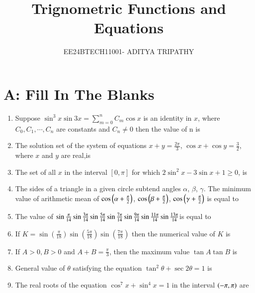 \documentclass[journal,12pt,twocolumn]{IEEEtran}
\title{Trignometric Functions and Equations}
\author{EE24BTECH11001- ADITYA TRIPATHY}
\theoremstyle{remark}
\begin{document}
\maketitle

\section*{\textbf{A: Fill In The Blanks}}


\begin{enumerate}
	


	 
	\item Suppose $\sin^3{x}\sin3x = \sum_{m=0}^{n} C_m \cos x $ is an identity in $x$, where $C_0, C_1, \cdots , C_n$ are constants and $C_n \neq 0$ then the value of n is
		\hfill{}


	\item The solution set of the system of equations \(x + y = \frac{2\pi}{3}\), \(\cos x + \cos y = \frac{3}{2}\), where $x$ and $y$ are real,is 
		\hfill{}
  	\item The set of all $x$ in the interval $[0,\pi]$ for which $2 \sin^2 x -3\sin x +1 \ge 0$, is 
		\hfill{}
  
  
	
	\item The sides of a triangle in a given circle subtend angles $\alpha$, $\beta$, $\gamma$. The minimum value of arithmetic mean of $\cos \left(\alpha + \frac{\pi}{2}\right)$, $\cos \left(\beta + \frac{\pi}{2}\right)$, $\cos \left(\gamma + \frac{\pi}{2}\right)$ is equal to 
			\hfill{}
  
	

	\item The value of
	$\sin\frac{\pi}{14}\sin\frac{3\pi}{14}\sin\frac{5\pi}{14}\sin\frac{7\pi}{14}
		\\ \sin\frac{9\pi}{14}\sin\frac{11\pi}{14}\sin\frac{13\pi}{14} $is equal to  
		
			\hfill{}
  
  
	
	\item If $K = \sin(\frac{\pi}{18})\sin(\frac{5\pi}{18})\sin(\frac{7\pi}{18})$ then the numerical value of $K$ is  
		\hfill{}
  
  
	
	\item If $A > 0, B>0$ and $A + B = \frac{\pi}{3}$, then the maximum value $\tan A \tan B$ is  
		\hfill{}
  
	

	\item General value of $\theta$ satisfying the equation $\tan^{2}\theta +\sec2\theta = 1$ is 
		\hfill{}
  
	

	\item The real roots of the equation $\cos^{7}x + \sin^{4}x = 1$ in the interval $\left(-\pi,\pi\right)$ are 
		\hfill{}



\end{enumerate}  
\end{document}

